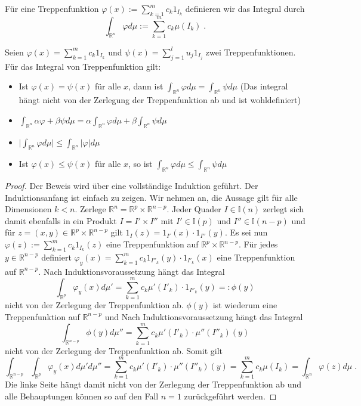 \begin{Definition}
Für eine Treppenfunktion $ \varphi(x) := \sum_{k=1}^m c_k 1_{I_k}$ definieren wir das Integral durch
$$\int_{\mathbb{R}^n} \varphi d\mu := \sum_{k =1}^m  c_k \mu(I_k) \; . $$
\end{Definition}

\begin{Satz}
\label{TFB}
Seien $\varphi(x) =   \sum_{k=1}^m  c_k 1_{I_k}$ und $\psi(x) =  \sum_{j=1}^l  u_j 1_{I_j}$ zwei Treppenfunktionen.
Für das Integral von Treppenfunktion gilt:
\begin{itemize}
\item Ist $\varphi(x) = \psi(x)$ für alle $x$, dann ist $\int_{\mathbb{R}^n} \varphi d\mu = \int_{\mathbb{R}^n} \psi d\mu$ (Das integral hängt nicht von der Zerlegung der Treppenfunktion ab und  ist wohldefiniert)
\item $\int_{\mathbb{R}^n} \alpha \varphi  + \beta \psi d\mu = \alpha \int_{\mathbb{R}^n}  \varphi d\mu + \beta  \int_{\mathbb{R}^n}  \psi d\mu$
\item $ \biggl|  \int_{\mathbb{R}^n} \varphi d\mu  \biggr| \leq \int_{\mathbb{R}^n} | \varphi | d\mu$
\item Ist $\varphi(x) \leq \psi(x)$ für alle $x$, so ist $\int_{\mathbb{R}^n} \varphi d\mu \leq \int_{\mathbb{R}^n} \psi d\mu$ 
\end{itemize}
\end{Satz}

\begin{proof}
Der Beweis wird über eine vollständige Induktion geführt. Der Induktionsanfang ist einfach zu zeigen. 
Wir nehmen an, die Aussage gilt für alle Dimensionen $k < n$.
Zerlege $\mathbb{R}^n = \mathbb{R}^p \times \mathbb{R}^{n-p}$. Jeder Quader $I \in \mathbb{I}(n)$ zerlegt sich damit ebenfalls in ein Produkt 
$I = I' \times I''$ mit $I'  \in \mathbb{I}(p)$ und  $I''  \in \mathbb{I}(n-p)$ und für $z = (x,y) \in  \mathbb{R}^p \times \mathbb{R}^{n-p}$ gilt $1_{I} (z) = 1_{I'}(x) \cdot 1_{I''}(y)$. Es sei nun $\varphi(z):=   \sum_{k=1}^m  c_k 1_{I_k}(z)$ eine Treppenfunktion auf $ \mathbb{R}^p \times \mathbb{R}^{n-p}$. Für jedes $y \in \mathbb{R}^{n-p}$ definiert  $\varphi_y(x)=   \sum_{k=1}^m  c_k 1_{I''_k}(y) \cdot 1_{I'_k}(x)$ eine Treppenfunktion auf $\mathbb{R}^{n-p}$. 
Nach Induktionsvoraussetzung hängt das Integral 
$$\int_{\mathbb{R}^p}  \varphi_y(x) d \mu' = \sum_{k=1}^m  c_k \mu'(I'_k)  \cdot 1_{I''_k}(y)  =: \phi(y)$$
nicht von der Zerlegung der Treppenfunktion ab. $\phi(y)$ ist wiederum eine Treppenfunktion auf $\mathbb{R}^{n-p}$ und Nach Induktionsvoraussetzung hängt das Integral 
$$\int_{\mathbb{R}^{n-p}}  \phi(y) d \mu'' = \sum_{k=1}^m  c_k \mu'(I'_k)  \cdot \mu'' (I''_k)(y) $$
nicht von der Zerlegung der Treppenfunktion ab. Somit gilt
$$\int_{\mathbb{R}^{n-p}} \int_{\mathbb{R}^p}  \varphi_y(x) d \mu'  d \mu''  =   \sum_{k=1}^m  c_k \mu'(I'_k)  \cdot \mu''(I''_k)(y) = \sum_{k=1}^m  c_k  \mu(I_k)  = \int_{\mathbb{R}^n} \varphi(z) d\mu\;.$$
Die linke Seite hängt  damit nicht von der Zerlegung der Treppenfunktion ab und alle Behauptungen können so auf den Fall $n=1$ zurückgeführt werden.
\end{proof}

